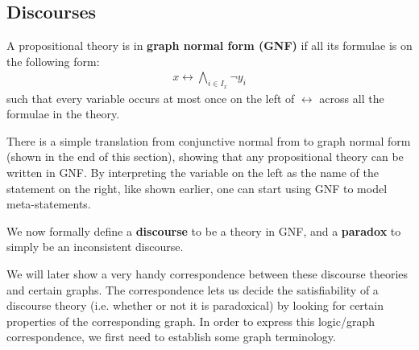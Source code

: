 \subsection{Discourses}
\label{sub:Discourses}
A propositional theory is in \textbf{graph normal form (GNF)} if all its formulae is on the following form:
\begin{align}
  x \leftrightarrow \bigwedge_{i \in I_x} \neg y_i
\end{align}
such that every variable occurs at most once on the left of $\leftrightarrow$ across all the formulae in the theory.

There is a simple translation from conjunctive normal from to graph normal form (shown in the end of this section), showing that any propositional theory can be written in GNF. By interpreting the variable on the left as the name of the statement on the right, like shown earlier, one can start using GNF to model meta-statements.

We now formally define a \textbf{discourse} to be a theory in GNF, and a \textbf{paradox} to simply be an inconsistent discourse.

We will later show a very handy correspondence between these discourse theories and certain graphs.
The correspondence lets us decide the satisfiability of a discourse theory (i.e. whether or not it is paradoxical) by looking for certain properties of the corresponding graph.
In order to express this logic/graph correspondence, we first need to establish some graph terminology.

